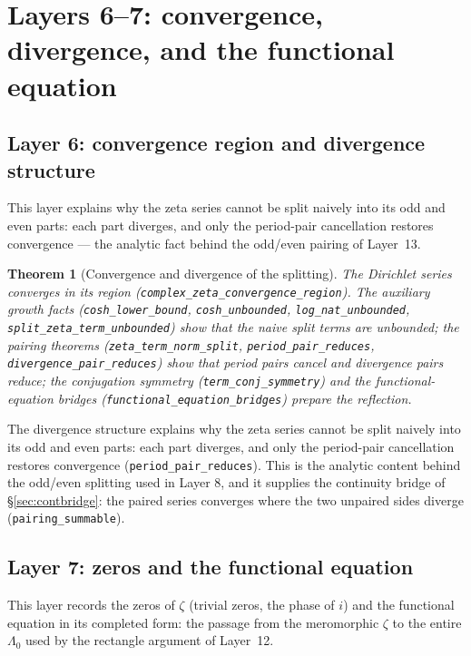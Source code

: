 \documentclass{article}
\newtheorem{theorem}{Theorem}[section]
\newcommand{\zt}{\zeta}
\newcommand{\Lam}{\Lambda}
\begin{document}
\section{Layers 6--7: convergence, divergence, and the functional equation}
\label{sec:L6}

\subsection{Layer 6: convergence region and divergence structure}
\label{sec:L6a}

This layer explains why the zeta series cannot be split naively into its
odd and even parts: each part diverges, and only the period-pair
cancellation restores convergence --- the analytic fact behind the
odd/even pairing of Layer~13.

\begin{theorem}[Convergence and divergence of the splitting]
\label{thm:divergence}
The Dirichlet series converges in its region
(\texttt{complex\_zeta\_convergence\_region}). The auxiliary growth facts
(\texttt{cosh\_lower\_bound}, \texttt{cosh\_unbounded},
\texttt{log\_nat\_unbounded}, \texttt{split\_zeta\_term\_unbounded}) show
that the naive split terms are unbounded; the pairing theorems
(\texttt{zeta\_term\_norm\_split}, \texttt{period\_pair\_reduces},
\texttt{divergence\_pair\_reduces}) show that period pairs cancel and
divergence pairs reduce; the conjugation symmetry
(\texttt{term\_conj\_symmetry}) and the functional-equation bridges
(\texttt{functional\_equation\_bridges}) prepare the reflection.
\end{theorem}

The divergence structure explains why the zeta series cannot be split
naively into its odd and even parts: each part diverges, and only the
period-pair cancellation restores convergence
(\texttt{period\_pair\_reduces}). This is the analytic content
behind the odd/even splitting used in Layer 8, and it supplies the
continuity bridge of \S\ref{sec:contbridge}: the paired series converges
where the two unpaired sides diverge (\texttt{pairing\_summable}).

\subsection{Layer 7: zeros and the functional equation}
\label{sec:L7}

This layer records the zeros of $\zt$ (trivial zeros, the phase of $i$)
and the functional equation in its completed form: the passage from the
meromorphic $\zt$ to the entire $\Lam_0$ used by the rectangle argument
of Layer~12.
\end{document}
